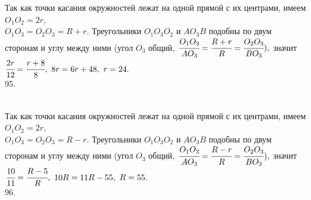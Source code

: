 \documentclass[12pt]{article}
\begin{document}
Так как точки касания окружностей лежат на одной прямой с их центрами, имеем $O_1O_2=2r,$\\$O_1O_3=O_2O_3=R+r.$ Треугольники $O_1O_3O_2$ и $AO_3B$ подобны по двум сторонам и углу между ними (угол $O_3$ общий, $\cfrac{O_1O_3}{AO_3}=\cfrac{R+r}{R}=\cfrac{O_2O_3}{BO_3}),$ значит $\cfrac{2r}{12}=\cfrac{r+8}{8},\ 8r=6r+48,\ r=24.$\\
95. \begin{figure}[ht!]
\end{figure}\\
Так как точки касания окружностей лежат на одной прямой с их центрами, имеем $O_1O_2=2r,$\\$O_1O_3=O_2O_3=R-r.$ Треугольники $O_1O_3O_2$ и $AO_3B$ подобны по двум сторонам и углу между ними (угол $O_3$ общий, $\cfrac{O_1O_3}{AO_3}=\cfrac{R-r}{R}=\cfrac{O_2O_3}{BO_3}),$ значит $\cfrac{10}{11}=\cfrac{R-5}{R},\ 10R=11R-55,\ R=55.$\\
96. \begin{figure}[ht!]
\end{figure}\\
\end{document}
